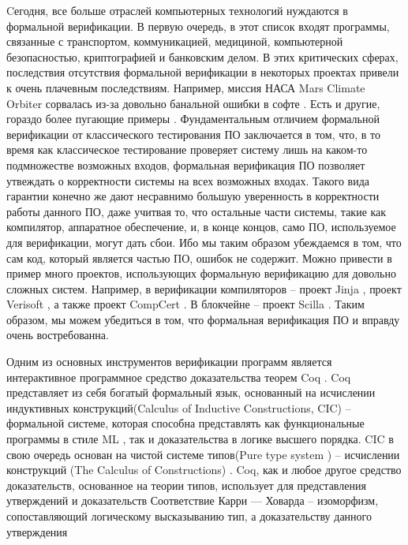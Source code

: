 Cегодня, все больше отраслей компьютерных технологий нуждаются в формальной верификации. В первую очередь, в этот список входят программы,
связанные с транспортом, коммуникацией, медициной, компьютерной безопасностью, криптографией и банковским делом.
В этих критических сферах,
последствия отсутствия формальной верификации в некоторых проектах привели к очень плачевным последствиям. Например, миссия НАСА Mars Climate Orbiter
сорвалась из-за довольно банальной ошибки в софте \cite{horror}. Есть и другие, гораздо более пугающие примеры \cite{horror}.
Фундаментальным отличием формальной верификации от классического тестирования ПО заключается в том, что, в то время как классическое
тестирование проверяет систему лишь на каком-то подмножестве возможных входов, формальная верификация ПО позволяет утвеждать о
корректности системы на всех возможных входах. Такого вида гарантии конечно же дают несравнимо большую уверенность в корректности
работы данного ПО, даже учитвая то, что остальные части системы, такие как компилятор, аппаратное обеспечение, и,
в конце концов, само ПО, используемое для верификации, могут дать сбои. Ибо мы таким образом убеждаемся в том, что сам код, который
является частью ПО, ошибок не содержит. Можно привести в пример много проектов, использующих формальную верификацию для довольно сложных
систем. Например, в верификации компиляторов -- проект Jinja \cite{KleinN-TCS,KleinN-ACM}, проект Verisoft
\cite{Strecker_compilerverification,Leinenbach}, а также проект CompCert \cite{Xavier,CompCert}.
В блокчейне -- проект Scilla \cite{sergey2018scilla}. Таким образом, мы можем убедиться в том, что формальная верификация ПО
и вправду очень востребованна.
\par
Одним из основных инструментов верификации программ является интерактивное программное средство доказательства теорем Coq
\cite{the_coq_development_team_2021_4501022}. Coq представляет из себя богатый формальный язык, основанный на
исчислении индуктивных конструкций(Calculus of Inductive Constructions, CIC) \cite{CIC} -- формальной системе, которая способна
представлять как функциональные программы в стиле ML \cite{ML-lang}, так и доказательства в логике высшего порядка. CIC в свою
очередь основан на чистой системе типов(Pure type system \cite{PTS}) -- исчислении конструкций (The Calculus of Constructions) \cite{CalculusOfConstructions}.
Coq, как и любое другое средство доказательств, основанное на теории типов, использует для представления утверждений и доказательств
Соответствие Карри — Ховарда \cite{CurryHowardIsom} -- изоморфизм, сопоставляющий логическому высказыванию тип, а доказательству данного утверждения
